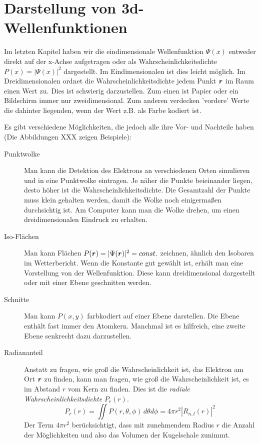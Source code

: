 \section{Darstellung von 3d-Wellenfunktionen}

Im letzten Kapitel haben wir die eindimensionale Wellenfunktion $\Psi(x)$ entweder direkt auf der x-Achse aufgetragen oder als Wahrscheinlichkeitsdichte $P(x) = |\Psi(x)|^2$ dargestellt. Im Eindimensionalen ist dies leicht möglich. Im Dreidimensionalen ordnet die Wahrscheinlichkeitsdichte jedem Punkt $\boldsymbol{r}$ im Raum einen Wert zu. Dies ist schwierig darzustellen. Zum einen ist Papier oder ein Bildschirm immer nur zweidimensional. Zum anderen verdecken 'vordere' Werte die dahinter liegenden, wenn der Wert z.B. als Farbe kodiert ist.

Es gibt verschiedene Möglichkeiten, die jedoch alle ihre Vor- und Nachteile haben (Die Abbildungen XXX zeigen Beispiele):
\begin{description}
    \item[Punktwolke] Man kann die Detektion des Elektrons an verschiedenen Orten simulieren und in eine Punktwolke eintragen. Je näher die Punkte beieinander liegen, desto höher ist die Wahrscheinlichkeitsdichte. Die Gesamtzahl der Punkte muss klein gehalten werden, damit die Wolke noch einigermaßen durchsichtig ist. Am Computer kann man die Wolke drehen, um einen dreidimensionalen Eindruck zu erhalten.
    \item[Iso-Flächen] Man kann Flächen $P(\boldsymbol{r}) = |\Psi(\boldsymbol{r})|^2 = const.$ zeichnen, ähnlich den Isobaren im Wetterbericht. Wenn die Konstante gut gewählt ist, erhält man eine Vorstellung von der Wellenfunktion. Diese kann dreidimensional dargestellt oder mit einer Ebene geschnitten werden.
    \item[Schnitte] Man kann $P(x,y)$ farbkodiert auf einer Ebene darstellen. Die Ebene enthält fast immer den Atomkern. Manchmal ist es hilfreich, eine zweite Ebene senkrecht dazu darzustellen.
    \item[Radiananteil] Anstatt zu fragen, wie groß die Wahrscheinlichkeit ist, das Elektron am Ort $\boldsymbol{r}$ zu finden, kann man fragen, wie groß die Wahrscheinlichkeit ist, es im Abstand $r$ vom Kern zu finden. Dies ist die \emph{radiale Wahrscheinlichkeitsdichte} $P_r(r)$.
    \begin{equation}
        P_r(r) = \iint P(r, \theta, \phi) \, d\theta d\phi = 4 \pi r^2 |R_{n,l}(r)|^2
    \end{equation}
    Der Term $4 \pi r^2$ berücksichtigt, dass mit zunehmendem Radius $r$ die Anzahl der Möglichkeiten und also das Volumen der Kugelschale zunimmt.
\end{description}


